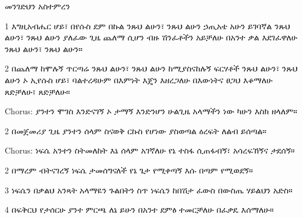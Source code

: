 \documentclass[12pt]{article}
\begin{document}
\begin{hymn}{4}{መንገድህን አስተምረን}
\begin{stanza}
1 እግዚአብሔር ሆይ፣ በየሱስ ደም በኩል 
ንጹህ ልሁን፣ ንጹህ ልሁን
ኃጢአቴ አሁን ይገባኛል
ንጹህ ልሁን፣ ንጹህ ልሁን
ያለፈው ጊዜ ጨለማ ሲሆን
ብዙ ሽንፈቶችን አይቻለሁ
በአንተ ቃል እደገፈዋለሁ
ንጹህ ልሁን፣ ንጹህ ልሁን።
\end{stanza}
\begin{stanza}
2 በጨለማ ከሞሉኝ ጥርጣሬ
ንጹህ ልሁን፣ ንጹህ ልሁን
ከሚያስናከሉኝ ፍርሃቶች
ንጹህ ልሁን፣ ንጹህ ልሁን
ኦ ኢየሱስ ሆይ፣ ባልተረዳሁም
በእምነት እጄን እዘረጋለሁ
በእውነትና ፀጋህ እቆማለሁ
ጸድቻለሁ፣ ጸድቻለሁ።
\end{stanza}
\begin{chorus}
Chorus: ያንተን ሞገስ እንድናገኝ
ኦ ታማኝ እንድንሆን
ሁልጊዜ አላማችን ነው
ካሁን እስክ ዘላለም።
\end{chorus}
\begin{stanza}
2 በመጀመሪያ ጊዜ
ያንተን ሰላም ስናወቅ
ርኩስ የሆነው ያስወጣል
ዕረፍት ለልብ ይሰጣል።
\end{stanza}
\begin{chorus}
Chorus: ነፍሴ አንተን ስትመለከት
እኔ ሰላም አገኛለሁ
የኔ ተስፋ ሲጠፋብኝ፣
አሳረፍኸኝና ታደሰኝ።
\end{chorus}
\begin{stanza}
2 በማረም ብትናገረኝ
ነፍሴ ታመሰግናለች
የኔ ጌታ የሚቀጣኝ
እሱ በጣም የሚወደኝ።
\end{stanza}
\begin{stanza}
3 ነፍሴን በቃልህ አንጻት
አላማዬን ጉልበትን ስጥ
ነፍሴን ከበሽታ ፈውስ
በውስጤ ሃይልህን አድስ።
\end{stanza}
\begin{stanza}
4 በፍቅርህ የታሰርሁ
ያንተ ምርጫ ለኔ ይሁን 
በአንተ ደምፅ ተመርቻለሁ
በፈቃዴ እሰማለሁ።
\end{stanza}
\end{hymn}

\newpage
\tableofcontents
\end{document}
